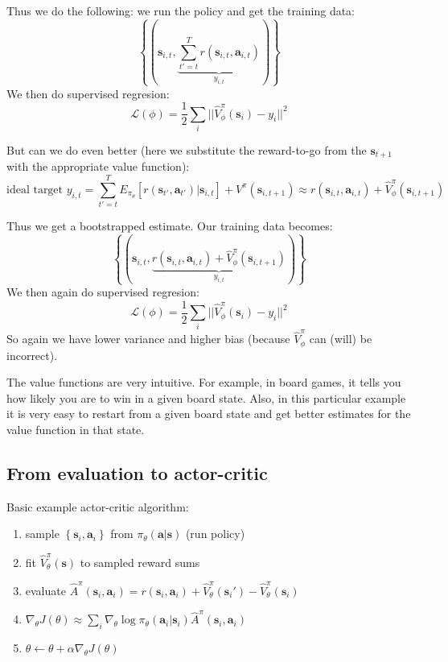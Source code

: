 \documentclass{report}
\begin{document}
Thus we do the following: we run the policy and get the training data:
\begin{equation}
		\left\{ \left( \bm{s}_{i,t}, \underbrace{\sum_{t'=t}^{T} r(\bm{s}_{i,t}, \bm{a}_{i,t})}_{y_{i,t}} \right)  \right\} 
\end{equation}
We then do supervised regresion:
\begin{equation}
		\mathcal{L}(\phi) = \frac{1}{2} \sum_{i}^{} ||\hat{V}^\pi_\phi (\bm{s}_i) - y_i||^2
\end{equation}

But can we do even better (here we substitute the reward-to-go from the $\bm{s}_{t+1}$ with the appropriate value function):
\begin{equation}
		\text{ideal target } y_{i,t} = \sum_{t'=t}^{T} E_{\pi_\theta} \left[ r(\bm{s}_{t'}, \bm{a}_{t'})|\bm{s}_{i,t}\right] + V^\pi(\bm{s}_{i,t+1})  
		\approx r(\bm{s}_{i,t}, \bm{a}_{i,t}) + \hat{V}^\pi_\phi(\bm{s}_{i,t+1}) 
\end{equation}

Thus we get a bootstrapped estimate.
Our training data becomes:
\begin{equation}
		\left\{ \left( \bm{s}_{i,t}, \underbrace{r(\bm{s}_{i,t}, \bm{a}_{i,t}) + \hat{V}^\pi_\phi(\bm{s}_{i,t+1}) }_{y_{i,t}} \right)  \right\} 
\end{equation}
We then again do supervised regresion:
\begin{equation}
		\mathcal{L}(\phi) = \frac{1}{2} \sum_{i}^{} ||\hat{V}^\pi_\phi (\bm{s}_i) - y_i||^2
\end{equation}
So again we have lower variance and higher bias (because $\hat{V}^\pi_\phi$ can (will) be incorrect).

The value functions are very intuitive. For example, in board games,
it tells you how likely you are to win in a given board state.
Also, in this particular example it is very easy to restart from a given board state 
and get better estimates for the value function in that state.

\subsection{From evaluation to actor-critic}
Basic example actor-critic algorithm:
\begin{enumerate}
		\item sample $\left\{ \bm{s}_i, \bm{a}_i \right\}$  from  $\pi_\theta (\bm{a}|\bm{s})$ (run policy)
		\item fit $ \hat{V}^\pi_\theta(\bm{s})$ to sampled reward sums
		\item evaluate $\hat{A}^\pi (\bm{s}_{i}, \bm{a}_{i}) = r(\bm{s}_{i}, \bm{a}_{i}) + \hat{V}^\pi_\theta(\bm{s}_i') - \hat{V}^\pi_\theta(\bm{s}_i) $
		\item $\nabla_\theta J(\theta) \approx \sum_{i}^{} \nabla_{\theta} \log \pi_\theta (\bm{a}_i|\bm{s}_i) \hat{A}^\pi (\bm{s}_{i}, \bm{a}_{i})$
		\item $\theta \leftarrow \theta + \alpha \nabla_\theta J(\theta)$
\end{enumerate}
\end{document}
